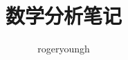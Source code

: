 \documentclass{probook}
\title{数学分析笔记}
\author{rogeryoungh}
\begin{document}
\newcommand\mfrac[2]{\dfrac{#1\smash[b]{\strut}}{#2\smash[t]{\strut}}}
\newcommand\RR{\mathbb{R}}
\newcommand\NN{\mathbb{N}}
\newcommand\QQ{\mathbb{Q}}
\newcommand\ZZ{\mathbb{Z}}
\newcommand\ee{\mathrm{e}}
\newcommand\dd{\mathrm{d}}
\newcommand\uppi{\mathrm{\pi}}

\newcommand\dom{\operatorname{\mathbf{Dom}}}
\newcommand\im{\operatorname{\mathbf{Im}}}
\newcommand\graph{\operatorname{\mathbf{graph}}}
\newcommand\LIM{\operatorname{{LIM}}}

\maketitle

\frontmatter

\tableofcontents

\mainmatter

\end{document}
